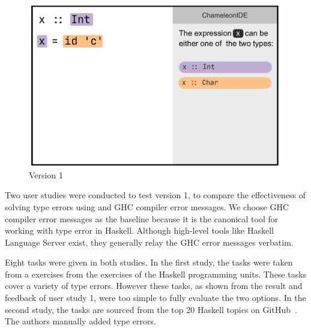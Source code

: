 \begin{figure}[h]
    \centering
    \includegraphics[width=\linewidth]{images/chameleon-v1.pdf}
    \caption{
        \chameleon{} Version 1
        }
    \label{fig:chameleon-v1}
\end{figure}

Two user studies were conducted to test \chameleon{} version 1, to compare the effectiveness of solving type errors using \chameleon{} and GHC compiler error messages. We choose GHC compiler error messages as the baseline because it is the canonical tool for working with type error in Haskell. Although high-level tools like Haskell Language Server exist, they generally relay the GHC error messages verbatim. 


Eight tasks were given in both studies. In the first study, the tasks were taken from a exercises from the exercises of the Haskell programming units. These tasks cover a variety of type errors.  However these tasks, as shown from the result and feedback of user study 1, were too simple to fully evaluate the two options. In the second study, the tasks are sourced from the top 20 Haskell topics on GitHub~\cite{githubHaskell}. The authors manually added type errors. 




